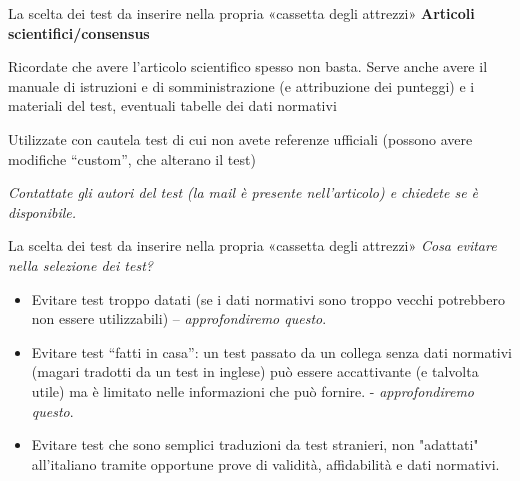 \documentclass[
  ignorenonframetext,
]{beamer}
\begin{document}
\begin{frame}{\small La scelta dei test da inserire nella propria
«cassetta degli attrezzi»}
\label{la-scelta-dei-test-da-inserire-nella-propria-cassetta-degli-attrezzi-4}
\textbf{Articoli scientifici/consensus}

Ricordate che avere l'articolo scientifico spesso non basta. Serve anche
avere il manuale di istruzioni e di somministrazione (e attribuzione dei
punteggi) e i materiali del test, eventuali tabelle dei dati normativi

Utilizzate con cautela test di cui non avete referenze ufficiali
(possono avere modifiche ``custom'', che alterano il test)

\emph{Contattate gli autori del test (la mail è presente nell'articolo)
e chiedete se è disponibile.}
\end{frame}

\begin{frame}{La scelta dei test da inserire nella propria «cassetta
degli attrezzi»}
\label{la-scelta-dei-test-da-inserire-nella-propria-cassetta-degli-attrezzi-5}
\emph{Cosa evitare nella selezione dei test?}

\begin{itemize}[<*>] 
  \item Evitare test troppo datati (se i dati normativi sono troppo vecchi potrebbero non essere utilizzabili) –     \emph{approfondiremo questo}.
  \item Evitare test “fatti in casa”: un test passato da un collega senza dati normativi (magari tradotti da un test in inglese) può essere accattivante (e talvolta utile) ma è limitato nelle informazioni che può fornire. - \emph{approfondiremo questo}.
  \item Evitare test che sono semplici traduzioni da test stranieri, non "adattati" all'italiano tramite opportune prove di validità, affidabilità e dati normativi.
\end{itemize}
\end{frame}
\end{document}
